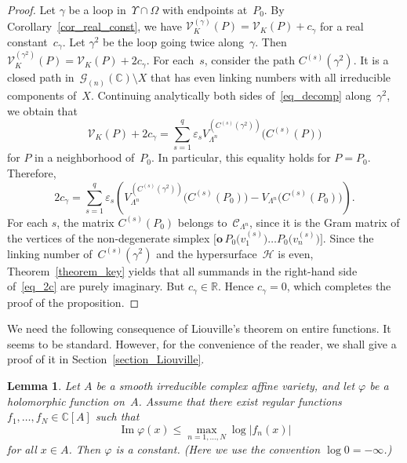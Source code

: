 \documentclass[reqno,tbtags,12pt]{amsart}
\numberwithin{equation}{section}
\newcommand{\R}{\mathbb{R}}
\newcommand{\CH}{\mathcal{H}}
\newcommand{\CC}{\mathcal{C}}
\newcommand{\C}{\mathbb{C}}
\newcommand{\CV}{\mathcal{V}}
\newcommand{\CG}{\mathcal{G}}
\newcommand{\bo}{\mathbf{o}}
\renewcommand{\Im}{\mathop{\mathrm{Im}}\nolimits}
\newtheorem{lem}[theorem]{Lemma}
\theoremstyle{definition}
\begin{document}
\begin{proof}
Let $\gamma$ be a loop in~$\Upsilon\cap\Omega$ with endpoints at~$ P_0$.  By Corollary~\ref{cor_real_const}, we have $\CV_{K}^{(\gamma)}( P)=\CV_K( P)+c_{\gamma}$ for a real constant~$c_{\gamma}$. Let $\gamma^2$ be the loop  going twice along~$\gamma$. Then  $\CV_{K}^{(\gamma^2)}( P)=\CV_K( P)+2c_{\gamma}$. For each~$s$, consider the path $C^{(s)}(\gamma^2)$. It is a closed path in~$\CG_{(n)}(\C)\setminus X$  that has even linking numbers with all irreducible components of~$X$.  Continuing analytically both sides of~\eqref{eq_decomp} along~$\gamma^2$, we obtain that
 \begin{equation*}
\CV_K( P)+2c_{\gamma}=\sum_{s=1}^q\varepsilon_sV^{\left(C^{(s)}(\gamma^2)\right)}_{\Lambda^n}\bigl(C^{(s)}( P)\bigr)
\end{equation*}
for $ P$ in a neighborhood of~$ P_0$. In particular, this equality holds for $ P= P_0$.
Therefore,
\begin{equation}\label{eq_2c}
2c_{\gamma}=\sum_{s=1}^q\varepsilon_s\left(V_{\Lambda^n}^{\left(C^{(s)}(\gamma^2)\right)}\bigl(C^{(s)}( P_0)\bigr)-V_{\Lambda^n}\bigl(C^{(s)}( P_0)\bigr)\right).
\end{equation}
For each $s$, the matrix $C^{(s)}( P_0)$ belongs to~$\CC_{\Lambda^n}$, since it is the Gram matrix of the vertices of the non-degenerate simplex $\bigl[\bo\, P_0\bigl(v_1^{(s)}\bigr)\ldots  P_0\bigl(v_n^{(s)}\bigr)\bigr]$. Since the linking number of~$C^{(s)}(\gamma^2)$ and the hypersurface~$\CH$ is even, Theorem~\ref{theorem_key} yields that all summands in the right-hand side of~\eqref{eq_2c} are purely imaginary. But $c_{\gamma}\in\R$. Hence $c_{\gamma}=0$, which completes the proof of the proposition.
\end{proof}



We need the following consequence of Liouville's theorem on entire functions. It seems to be standard. However, for the convenience of the reader, we shall give a proof of it in Section~\ref{section_Liouville}. 

\begin{lem}\label{lem_log}
Let $A$ be a smooth irreducible complex affine variety, and let $\varphi$ be a holomorphic function on~$A$. Assume that there exist regular functions $f_1,\ldots,f_N\in\C[A]$ such that 
\begin{equation}\label{eq_estimate}
\Im \varphi(x)\le \max_{n=1,\ldots,N} \log|f_n(x)|
\end{equation}
for all $x\in A$.  Then $\varphi$ is a constant. \textnormal{(}Here we use the convention $\log 0=-\infty$.\textnormal{)}
\end{lem}
\end{document}
